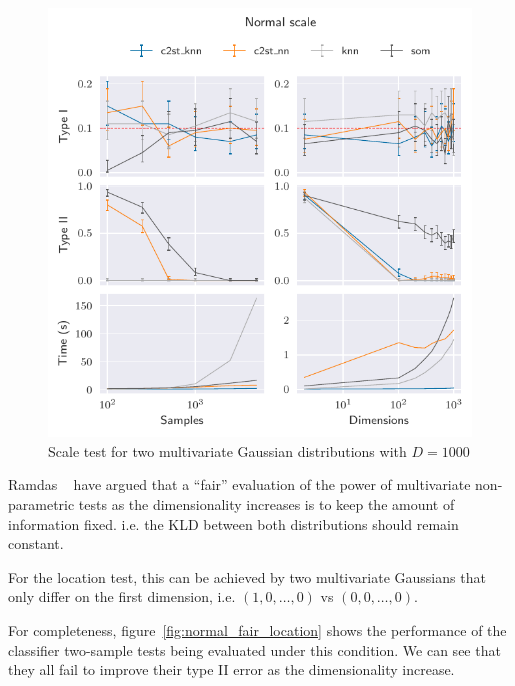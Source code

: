 \begin{figure}[htbp]
    \centering
    \includegraphics{images/6_som/normal_scale}
    \caption{Scale test for two multivariate Gaussian distributions with $D=1000$}
    \label{fig:normal_scale}
\end{figure}

Ramdas \etal~\cite{ramdas2015decreasing} have argued that a ``fair'' evaluation of the
power of multivariate non-parametric tests as the dimensionality increases is to keep the
amount of information fixed. i.e. the \gls{KLD} between both distributions
should remain constant.

For the location test, this can be achieved by two multivariate Gaussians that only differ
on the first dimension, i.e. $(1, 0, \ldots, 0)$ vs $(0, 0, \ldots, 0)$.

For completeness, figure~\ref{fig:normal_fair_location} shows the performance of the classifier
two-sample tests being evaluated under this condition. We can see that they all fail to improve
their type II error as the dimensionality increase.

